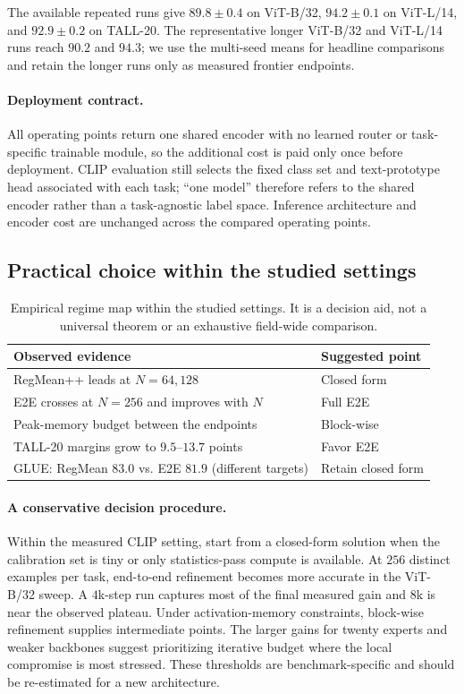 \documentclass[letterpaper]{article} %
\theoremstyle{plain}
\theoremstyle{definition}
\begin{document}
The available repeated runs give $89.8\pm0.4$ on ViT-B/32, $94.2\pm0.1$ on ViT-L/14, and $92.9\pm0.2$ on TALL-20.
The representative longer ViT-B/32 and ViT-L/14 runs reach $90.2$ and $94.3$; we use the multi-seed means for headline comparisons and retain the longer runs only as measured frontier endpoints.

\paragraph{Deployment contract.}
All operating points return one shared encoder with no learned router or task-specific trainable module, so the additional cost is paid only once before deployment.
CLIP evaluation still selects the fixed class set and text-prototype head associated with each task; ``one model'' therefore refers to the shared encoder rather than a task-agnostic label space.
Inference architecture and encoder cost are unchanged across the compared operating points.

\subsection{Practical choice within the studied settings}

\begin{table}[tb]
\centering
\small
\setlength{\tabcolsep}{4pt}
\begin{tabular}{p{}p{}}
\toprule
Observed evidence & Suggested point \\
\midrule
RegMean++ leads at $N=64,128$ & Closed form \\
E2E crosses at $N=256$ and improves with $N$ & Full E2E \\
Peak-memory budget between the endpoints & Block-wise \\
TALL-20 margins grow to $9.5$--$13.7$ points & Favor E2E \\
GLUE: RegMean $83.0$ vs. E2E $81.9$ (different targets) & Retain closed form \\
\bottomrule
\end{tabular}
\caption{Empirical regime map within the studied settings. It is a decision aid, not a
universal theorem or an exhaustive field-wide comparison.}
\label{tab:regime-map}
\end{table}

\paragraph{A conservative decision procedure.}
Within the measured CLIP setting, start from a closed-form solution when the calibration set is tiny or only statistics-pass compute is available.
At $256$ distinct examples per task, end-to-end refinement becomes more accurate in the ViT-B/32 sweep.
A $4$k-step run captures most of the final measured gain and $8$k is near the observed plateau.
Under activation-memory constraints, block-wise refinement supplies intermediate points.
The larger gains for twenty experts and weaker backbones suggest prioritizing iterative budget where the local compromise is most stressed.
These thresholds are benchmark-specific and should be re-estimated for a new architecture.
\end{document}
